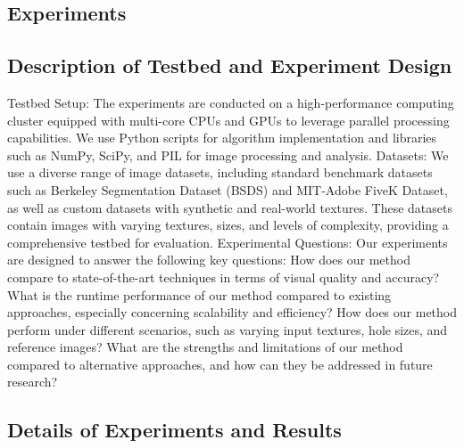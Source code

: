 \begin{experiments}
    
\section{Experiments}

\subsection{Description of Testbed and Experiment Design}

Testbed Setup: The experiments are conducted on a high-performance computing cluster equipped with multi-core CPUs and GPUs to leverage parallel processing capabilities. We use Python scripts for algorithm implementation and libraries such as NumPy, SciPy, and PIL for image processing and analysis.
Datasets: We use a diverse range of image datasets, including standard benchmark datasets such as Berkeley Segmentation Dataset (BSDS) and MIT-Adobe FiveK Dataset, as well as custom datasets with synthetic and real-world textures. These datasets contain images with varying textures, sizes, and levels of complexity, providing a comprehensive testbed for evaluation.
Experimental Questions: Our experiments are designed to answer the following key questions:
How does our method compare to state-of-the-art techniques in terms of visual quality and accuracy?
What is the runtime performance of our method compared to existing approaches, especially concerning scalability and efficiency?
How does our method perform under different scenarios, such as varying input textures, hole sizes, and reference images?
What are the strengths and limitations of our method compared to alternative approaches, and how can they be addressed in future research?

\subsection{Details of Experiments and Results}


\end{experiments}
